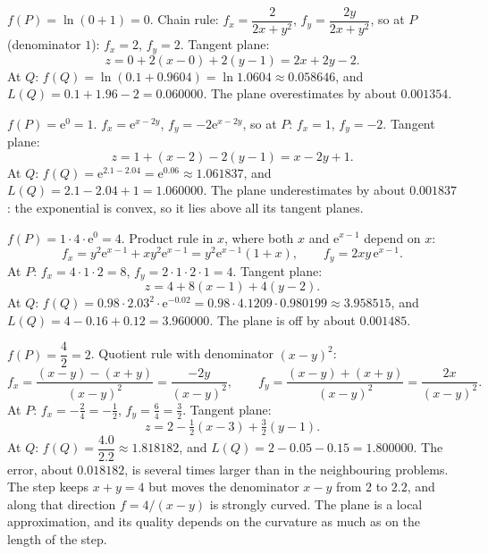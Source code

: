 \begin{solutions}
  \item $f(P)=\ln(0+1)=0$. Chain rule:
        $f_{x}=\dfrac{2}{2x+y^{2}}$, $f_{y}=\dfrac{2y}{2x+y^{2}}$, so at
        $P$ (denominator $1$): $f_{x}=2$, $f_{y}=2$. Tangent plane:
        \[
          z=0+2(x-0)+2(y-1)=2x+2y-2 .
        \]
        At $Q$: $f(Q)=\ln(0.1+0.9604)=\ln1.0604\approx0.058646$, and
        $L(Q)=0.1+1.96-2=0.060000$. The plane overestimates by about
        $0.001354$.

  \item $f(P)=\mathrm{e}^{0}=1$. $f_{x}=\mathrm{e}^{x-2y}$,
        $f_{y}=-2\mathrm{e}^{x-2y}$, so at $P$: $f_{x}=1$, $f_{y}=-2$.
        Tangent plane:
        \[
          z=1+(x-2)-2(y-1)=x-2y+1 .
        \]
        At $Q$: $f(Q)=\mathrm{e}^{2.1-2.04}=\mathrm{e}^{0.06}\approx1.061837$,
        and $L(Q)=2.1-2.04+1=1.060000$. The plane underestimates by about
        $0.001837$: the exponential is convex, so it lies above all its
        tangent planes.

  \item $f(P)=1\cdot4\cdot\mathrm{e}^{0}=4$. Product rule in $x$, where
        both $x$ and $\mathrm{e}^{x-1}$ depend on $x$:
        \[
          f_{x}=y^{2}\mathrm{e}^{x-1}+xy^{2}\mathrm{e}^{x-1}
               =y^{2}\mathrm{e}^{x-1}(1+x),\qquad
          f_{y}=2xy\,\mathrm{e}^{x-1} .
        \]
        At $P$: $f_{x}=4\cdot1\cdot2=8$, $f_{y}=2\cdot1\cdot2\cdot1=4$.
        Tangent plane:
        \[
          z=4+8(x-1)+4(y-2) .
        \]
        At $Q$: $f(Q)=0.98\cdot2.03^{2}\cdot\mathrm{e}^{-0.02}
        =0.98\cdot4.1209\cdot0.980199\approx3.958515$, and
        $L(Q)=4-0.16+0.12=3.960000$. The plane is off by about
        $0.001485$.

  \item $f(P)=\dfrac{4}{2}=2$. Quotient rule with denominator $(x-y)^{2}$:
        \[
          f_{x}=\frac{(x-y)-(x+y)}{(x-y)^{2}}=\frac{-2y}{(x-y)^{2}},\qquad
          f_{y}=\frac{(x-y)+(x+y)}{(x-y)^{2}}=\frac{2x}{(x-y)^{2}} .
        \]
        At $P$: $f_{x}=-\tfrac24=-\tfrac12$, $f_{y}=\tfrac64=\tfrac32$.
        Tangent plane:
        \[
          z=2-\tfrac12(x-3)+\tfrac32(y-1) .
        \]
        At $Q$: $f(Q)=\dfrac{4.0}{2.2}\approx1.818182$, and
        $L(Q)=2-0.05-0.15=1.800000$. The error, about $0.018182$, is
        several times larger than in the neighbouring problems. The step
        keeps $x+y=4$ but moves the denominator $x-y$ from $2$ to $2.2$,
        and along that direction $f=4/(x-y)$ is strongly curved. The plane
        is a local approximation, and its quality depends on the curvature
        as much as on the length of the step.


\end{solutions}
